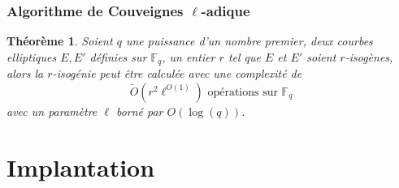 \documentclass[10pt,a4paper]{beamer}
\theoremstyle{plain}
\newtheorem{thm}{Théorème}[part]
\theoremstyle{definition}
\theoremstyle{definition}
\theoremstyle{definition}
\theoremstyle{definition}
\theoremstyle{remark}
\theoremstyle{remark}
\theoremstyle{definition}
\begin{document}

\begin{frame}
\frametitle{Algorithme de Couveignes $\ell$-adique}

\begin{thm}
Soient $q$ une puissance d'un nombre premier, deux courbes elliptiques $E,E'$
définies sur $\mathbb{F}_q$, un entier $r$ tel que $E$ et $E'$ soient 
$r$-isogènes, alors la $r$-isogénie peut être calculée avec une complexité de
\[
\tilde{O}(r^2 \ell^{O(1)}) \text{ opérations sur }\mathbb{F}_q
\]
avec un paramètre $\ell$ borné par $O(\log(q))$.
\end{thm}

\end{frame}

\section{Implantation}
\end{document}
